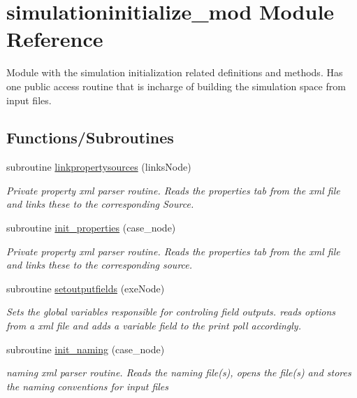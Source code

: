 \hypertarget{namespacesimulationinitialize__mod}{}\section{simulationinitialize\+\_\+mod Module Reference}
\label{namespacesimulationinitialize__mod}


Module with the simulation initialization related definitions and methods. Has one public access routine that is incharge of building the simulation space from input files.  


\subsection*{Functions/\+Subroutines}
\begin{DoxyCompactItemize}
\item 
subroutine \mbox{\hyperlink{namespacesimulationinitialize__mod_aa4c1099b84c9901ab1286a3796a54f71}{linkpropertysources}} (links\+Node)
\begin{DoxyCompactList}\small\item\em Private property xml parser routine. Reads the properties tab from the xml file and links these to the corresponding Source. \end{DoxyCompactList}\item 
subroutine \mbox{\hyperlink{namespacesimulationinitialize__mod_a532cb4960e93dc27cff5dc2e04afe070}{init\+\_\+properties}} (case\+\_\+node)
\begin{DoxyCompactList}\small\item\em Private property xml parser routine. Reads the properties tab from the xml file and links these to the corresponding source. \end{DoxyCompactList}\item 
subroutine \mbox{\hyperlink{namespacesimulationinitialize__mod_a09174fb4527277943700a5509de326dd}{setoutputfields}} (exe\+Node)
\begin{DoxyCompactList}\small\item\em Sets the global variables responsible for controling field outputs. reads options from a xml file and adds a variable field to the print poll accordingly. \end{DoxyCompactList}\item 
subroutine \mbox{\hyperlink{namespacesimulationinitialize__mod_a4909cc4cb57549e6eed3f69d6dfa30b5}{init\+\_\+naming}} (case\+\_\+node)
\begin{DoxyCompactList}\small\item\em naming xml parser routine. Reads the naming file(s), opens the file(s) and stores the naming conventions for input files \end{DoxyCompactList}\item 

\end{DoxyCompactItemize}
